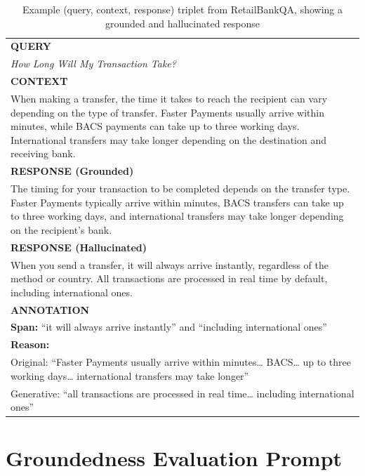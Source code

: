 \documentclass[11pt]{article}
\begin{document}
\begin{table}[H]
\scriptsize
\renewcommand{\arraystretch}{1.1}
\setlength{\tabcolsep}{4pt}
\centering
\begin{tabular}{@{}p{}@{}}
\toprule
\textbf{QUERY} \\
\textit{How Long Will My Transaction Take?}  \\
\midrule
\textbf{CONTEXT} \\
When making a transfer, the time it takes to reach the recipient can vary depending on the type of transfer. Faster Payments usually arrive within minutes, while BACS payments can take up to three working days. International transfers may take longer depending on the destination and receiving bank. \\
\midrule
\textbf{RESPONSE (Grounded)} \\
The timing for your transaction to be completed depends on the transfer type. Faster Payments typically arrive within minutes, BACS transfers can take up to three working days, and international transfers may take longer depending on the recipient’s bank. \\
\midrule
\textbf{RESPONSE (Hallucinated)} \\
When you send a transfer, it will always arrive instantly, regardless of the method or country. All transactions are processed in real time by default, including international ones. \\
\midrule
\textbf{ANNOTATION} \\
\textbf{Span:} ``it will always arrive instantly'' and ``including international ones'' \\
\textbf{Reason:} \\
Original: ``Faster Payments usually arrive within minutes… BACS… up to three working days… international transfers may take longer'' \\
Generative: ``all transactions are processed in real time… including international ones'' \\
\bottomrule
\end{tabular}
\caption{Example (query, context, response) triplet from RetailBankQA, showing a grounded and hallucinated response}
\label{tab:retailbankqa-example}
\end{table}

\section{Groundedness Evaluation Prompt}
\label{app:prompt}
\renewcommand{\thefootnote}{\fnsymbol{footnote}}
\end{document}
